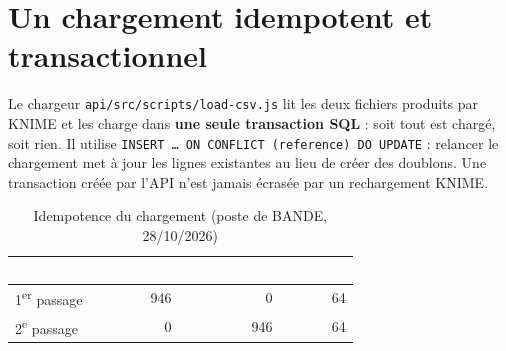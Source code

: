 \section{Un chargement idempotent et transactionnel}
Le chargeur \texttt{api/src/scripts/load-csv.js} lit les deux fichiers produits par KNIME et les
charge dans \textbf{une seule transaction SQL} : soit tout est chargé, soit rien. Il utilise
\texttt{INSERT \ldots{} ON CONFLICT (reference) DO UPDATE} : relancer le chargement met à jour les
lignes existantes au lieu de créer des doublons. Une transaction créée par l'API n'est jamais
écrasée par un rechargement KNIME.


\begin{table}[H]
\centering\small
\caption{Idempotence du chargement (poste de BANDE, 28/10/2026)}
\begin{tabular}{|l|r|r|r|}
\hline
\rowcolor{bluedark}\textcolor{white}{\textbf{Chargement}} & \textcolor{white}{\textbf{Insérées}} & \textcolor{white}{\textbf{Mises à jour}} & \textcolor{white}{\textbf{Rejetées}} \\
\hline
1\textsuperscript{er} passage & 946 & 0 & 64 \\
\hline
2\textsuperscript{e} passage & 0 & 946 & 64 \\
\hline
\end{tabular}
\end{table}
